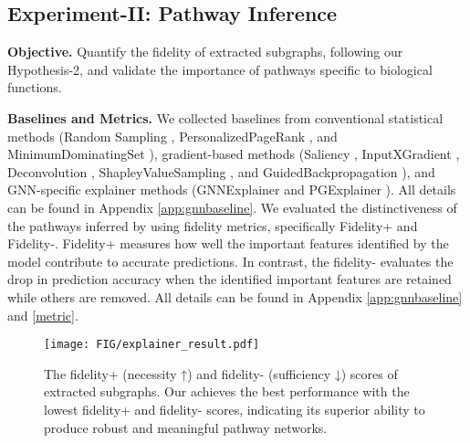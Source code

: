 \subsection{Experiment-II: Pathway Inference}
\label{subsec:exp2}

\textbf{Objective. } Quantify the fidelity of extracted subgraphs, following our Hypothesis-2, and validate the importance of pathways specific to biological functions.

\noindent\textbf{Baselines and Metrics. }
We collected baselines from conventional statistical methods (Random Sampling \cite{10.1093/bioinformatics/bth163}, PersonalizedPageRank \cite{PMID:21149343}, and MinimumDominatingSet \cite{NACHER201657, doi:10.1073/pnas.1311231111}), gradient-based methods (Saliency \cite{saliency}, InputXGradient \cite{InputXGradient}, Deconvolution \cite{deconvolustion}, ShapleyValueSampling \cite{shapley}, and GuidedBackpropagation \cite{guidedbackpropagation}), and GNN-specific explainer methods (GNNExplainer \cite{gnnexplainer} and PGExplainer \cite{pgexplainer}).
All details can be found in Appendix \ref{app:gnnbaseline}. 
We evaluated the distinctiveness of the pathways inferred by \explainer using fidelity metrics, specifically Fidelity+ and Fidelity-.
Fidelity+ measures how well the important features identified by the model contribute to accurate predictions.
In contrast, the fidelity- evaluates the drop in prediction accuracy when the identified important features are retained while others are removed.
All details can be found in Appendix \ref{app:gnnbaseline} and \ref{metric}.


\begin{figure}[t]
    \centering
    \texttt{[image: FIG/explainer\_result.pdf]} 
    \vspace{-0.4em} 
    \caption{The fidelity+ (necessity ↑) and fidelity- (sufficiency ↓) scores of extracted subgraphs.
    Our \explainer achieves the best performance with the lowest fidelity+ and fidelity- scores, indicating its superior ability to produce robust and meaningful pathway networks.}
    \vspace{-0.4em}
    \label{fig:scatter}
    \vspace{-0.4em}
\end{figure}


